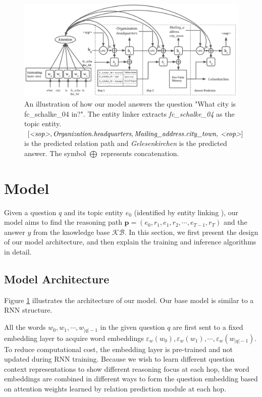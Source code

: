 \begin{figure}[t]
\includegraphics[width=2.1\columnwidth]{figs/model2.png}
\caption{\fontsize{10}{12}\selectfont An illustration of how our model answers the question "What city is fc\_schalke\_04 in?". The entity linker extracts \textit{fc\_schalke\_04} as the topic entity. $[\textit{\textless sop\textgreater}, \textit{Organization.headquarters} , \textit{Mailing\_address.city\_town, \textless eop\textgreater}]$ is the predicted relation path  and \textit{Gelesenkirchen} is the predicted answer. The symbol $\bigoplus$ represents concatenation. }
\label{fig:model}
\end{figure}


\section{Model}
 Given a question $q$ and its topic entity $e_0$ (identified by entity linking ), our model aims to find the reasoning path $\mathbf{p} = (e_{0},r_{1},e_{1},r_{2}, \cdots,e_{T-1}, r_{T})$ and the answer $y$ from the knowledge base $\mathcal{KB}$. In this section, we first present the design of our model architecture, and then explain the training and inference algorithms in detail.  

\subsection{Model Architecture}


Figure \ref{fig:model} illustrates the architecture of our model. Our base model is similar to a RNN structure.

 All the words $w_0,w_1,\cdots,w_{|q|-1}$ in the given question $q$ are first sent to a fixed embedding layer to acquire word embeddings $\varepsilon_w(w_0),\varepsilon_w(w_1),\cdots,\varepsilon_w(w_{|q|-1})$.  To reduce computational cost, the embedding layer is pre-trained and not updated during RNN training. Because we wish to learn different question context representations to show different reasoning focus at each hop, the  word embeddings are combined in different ways to form the question embedding  based on attention weights learned by relation prediction module at each hop.



